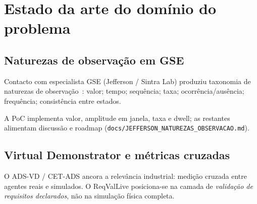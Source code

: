 \section{Estado da arte do domínio do problema}
\label{sec:estado-arte}

\subsection{Naturezas de observação em GSE}

Contacto com especialista GSE (Jefferson / Sintra Lab) produziu taxonomia de
naturezas de observação~\cite{jefferson2026gse}: valor; tempo; sequência;
taxa; ocorrência/ausência; frequência; consistência entre estados.

A PoC implementa valor, amplitude em janela, taxa e dwell; as restantes alimentam
discussão e roadmap (\texttt{docs/JEFFERSON\_NATUREZAS\_OBSERVACAO.md}).

\subsection{Virtual Demonstrator e métricas cruzadas}

O ADS-VD / CET-ADS ancora a relevância industrial: medição cruzada entre
agentes reais e simulados. O ReqValLive posiciona-se na camada de \emph{validação
de requisitos declarados}, não na simulação física completa.
